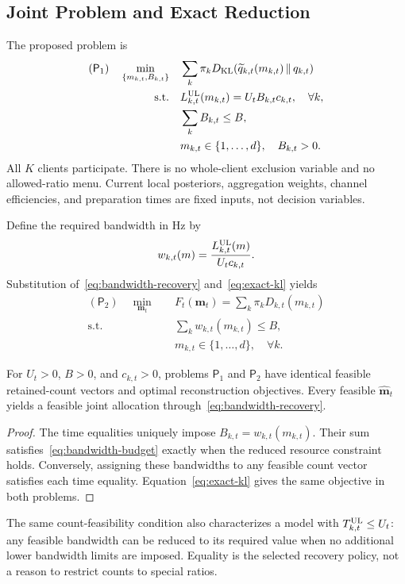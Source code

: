 \subsection{Joint Problem and Exact Reduction}
The proposed problem is
\begin{equation}
 \begin{aligned}
 (\mathsf P_1)\quad
 \min_{\{m_{k,t},B_{k,t}\}}\quad&
 \sum_k\pi_kD_{\mathrm{KL}}\!\left(\widetilde q_{k,t}(m_{k,t})\,\|\,q_{k,t}\right)\\
 \mathrm{s.t.}\quad&
 L_{k,t}^{\mathrm{UL}}(m_{k,t})=U_tB_{k,t}c_{k,t},\quad\forall k,\\
 &\sum_kB_{k,t}\le B,\\
 &m_{k,t}\in\{1,\ldots,d\},\quad B_{k,t}>0.
 \end{aligned}
 \label{prob:joint}
\end{equation}
All $K$ clients participate. There is no whole-client exclusion variable and no allowed-ratio menu. Current local posteriors, aggregation weights, channel efficiencies, and preparation times are fixed inputs, not decision variables.

Define the required bandwidth in Hz by
\begin{equation}
 w_{k,t}(m)=\frac{L_{k,t}^{\mathrm{UL}}(m)}{U_tc_{k,t}}.
 \label{eq:bandwidth-cost}
\end{equation}
Substitution of~\eqref{eq:bandwidth-recovery} and~\eqref{eq:exact-kl} yields
\begin{equation}
 \begin{aligned}
 (\mathsf P_2)\quad \min_{\mathbf m_t}\quad&
 F_t(\mathbf m_t)=\sum_k\pi_kD_{k,t}(m_{k,t})\\
 \mathrm{s.t.}\quad&\sum_kw_{k,t}(m_{k,t})\le B,\\
 &m_{k,t}\in\{1,\ldots,d\},\quad\forall k.
 \end{aligned}
 \label{prob:counts}
\end{equation}

\begin{proposition}
For $U_t>0$, $B>0$, and $c_{k,t}>0$, problems $\mathsf P_1$ and $\mathsf P_2$ have identical feasible retained-count vectors and optimal reconstruction objectives. Every feasible $\widehat{\mathbf m}_t$ yields a feasible joint allocation through~\eqref{eq:bandwidth-recovery}.
\end{proposition}
\begin{proof}
The time equalities uniquely impose $B_{k,t}=w_{k,t}(m_{k,t})$. Their sum satisfies~\eqref{eq:bandwidth-budget} exactly when the reduced resource constraint holds. Conversely, assigning these bandwidths to any feasible count vector satisfies each time equality. Equation~\eqref{eq:exact-kl} gives the same objective in both problems.
\end{proof}
The same count-feasibility condition also characterizes a model with $T_{k,t}^{\mathrm{UL}}\le U_t$: any feasible bandwidth can be reduced to its required value when no additional lower bandwidth limits are imposed. Equality is the selected recovery policy, not a reason to restrict counts to special ratios.

